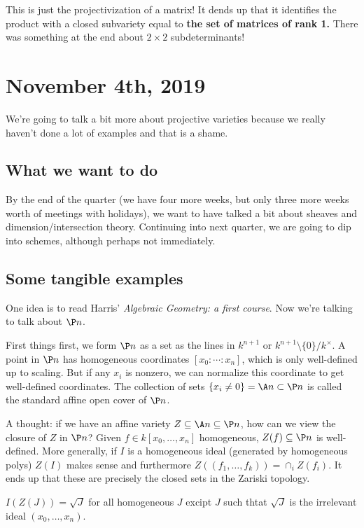 \documentclass[12pt]{article}
\begin{document}
This is just the projectivization of a matrix! It dends up that it identifies the product with a closed subvariety equal to \textbf{the set of matrices of rank 1.}
There was something at the end about $2\times 2$ subdeterminants!

\section{November 4th, 2019}
We're going to talk a bit more about projective varieties because we really haven't done a lot of examples and that is a shame.

\subsection{What we want to do}
By the end of the quarter (we have four more weeks, but only three more weeks worth of meetings with holidays), we want to 
have talked a bit about sheaves and dimension/intersection theory. Continuing into next quarter, we are going to dip into schemes, although perhaps not immediately.

\subsection{Some tangible examples}
One idea is to read Harris' \textit{Algebraic Geometry: a first course}. Now we're talking to talk about $\P n$. 

First things first, we form $\P n$ as a set as the lines in $k^{n+1}$ or $k^{n+1}\setminus \{0\}/k^\times$. A point in $\P n$ 
has homogeneous coordinates $[x_0:\cdots:x_n]$, which is only well-defined up to scaling. But if any $x_i$ is nonzero, we can normalize this 
coordinate to get well-defined coordinates. The collection of sets $\{x_i\ne 0\}=\A n\subset \P n$ is called the standard affine open 
cover of $\P n$.

A thought: if we have an affine variety $Z\subseteq \A n\subseteq \P n$, how can we view the closure of $Z$ in $\P n$?
Given $f\in k[x_0,\dots,x_n]$ homogeneous, $Z(f)\subseteq \P n$ is well-defined. More generally, if $I$ is a homogeneous ideal (generated by homogeneous polys)
$Z(I)$ makes sense and furthermore $Z((f_1,\dots,f_k))=\cap_i Z(f_i)$. It ends up that these are precisely the closed sets in the Zariski topology.

\begin{thm}
	$I(Z(J))=\sqrt{J}$ for all homogeneous $J$ excipt $J$ such thtat $\sqrt{J}$ is the irrelevant ideal $(x_0,\dots,x_n)$.
\end{thm}
\end{document}
